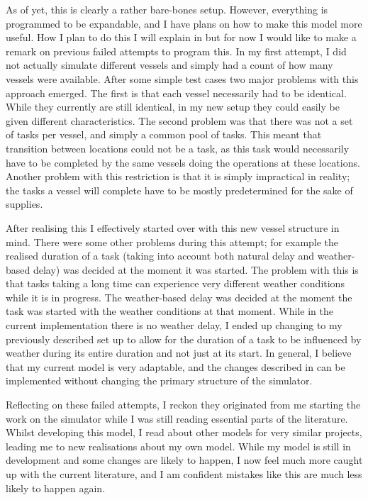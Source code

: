 \documentclass[a4paper,12pt]{article}
\begin{document}
\bigskip

As of yet, this is clearly a rather bare-bones setup. However, everything is programmed to be expandable, and I have plans on how to make this model more useful. How I plan to do this I will explain in  but for now I would like to make a remark on previous failed attempts to program this. In my first attempt, I did not actually simulate different vessels and simply had a count of how many vessels were available. After some simple test cases two major problems with this approach emerged. The first is that each vessel necessarily had to be identical. While they currently are still identical, in my new  setup they could easily be given different characteristics. The second problem was that there was not a set of tasks per vessel, and simply a common pool of tasks. This meant that transition between locations could not be a task, as this task would necessarily have to be completed by the same vessels doing the operations at these locations. Another problem with this restriction is that it is simply impractical in reality; the tasks a vessel will complete have to be mostly predetermined for the sake of supplies.

After realising this I effectively started over with this new vessel structure in mind. There were some other problems during this attempt; for example the realised duration of a task (taking into account both natural delay and weather-based delay) was decided at the moment it was started. The problem with this is that tasks taking a long time can experience very different weather conditions while it is in progress. The weather-based delay was decided at the moment the task was started with the weather conditions at that moment. While in the current implementation there is no weather delay, I ended up changing to my previously described set up to allow for the duration of a task to be influenced by weather during its entire duration and not just at its start. In general, I believe that my current model is very adaptable, and the changes described in  can be implemented without changing the primary structure of the simulator. 

Reflecting on these failed attempts, I reckon they originated from me starting the work on the simulator while I was still reading essential parts of the literature. Whilst developing this model, I read about other models for very similar projects, leading me to new realisations about my own model. While my model is still in development and some changes are likely to happen, I now feel much more caught up with the current literature, and I am confident mistakes like this are much less likely to happen again. 
\end{document}
